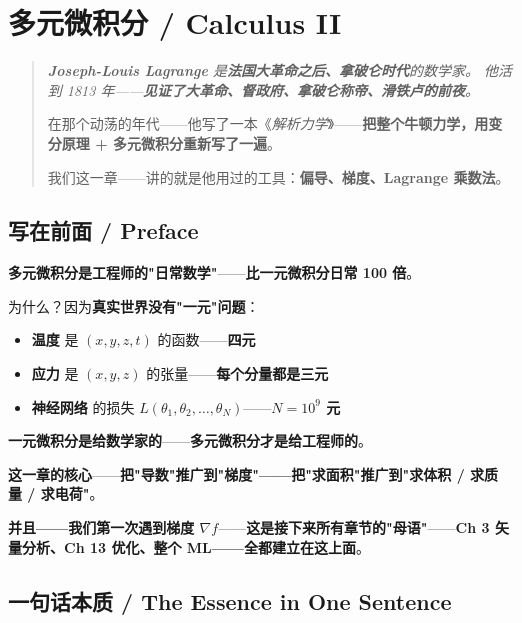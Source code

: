 
\chapter{多元微积分 / Calculus II}
\label{ch:calc2}

\begin{quote}\itshape
\textbf{Joseph-Louis Lagrange} 是\textbf{法国大革命之后、拿破仑时代}的数学家。
他活到 1813 年——\textbf{见证了大革命、督政府、拿破仑称帝、滑铁卢的前夜}。

在那个动荡的年代——他写了一本《\textit{解析力学}》——\textbf{把整个牛顿力学，用变分原理 + 多元微积分重新写了一遍}。

我们这一章——讲的就是他用过的工具：\textbf{偏导、梯度、Lagrange 乘数法}。
\end{quote}

\section{写在前面 / Preface}

\textbf{多元微积分是工程师的"日常数学"}——\textbf{比一元微积分日常 100 倍}。

为什么？因为\textbf{真实世界没有"一元"问题}：

\begin{itemize}
\item \textbf{温度} 是 $(x, y, z, t)$ 的函数——\textbf{四元}
\item \textbf{应力} 是 $(x, y, z)$ 的张量——\textbf{每个分量都是三元}
\item \textbf{神经网络} 的损失 $L(\theta_1, \theta_2, \ldots, \theta_N)$——\textbf{$N=10^9$ 元}
\end{itemize}

\textbf{一元微积分是给数学家的}——\textbf{多元微积分才是给工程师的}。

\textbf{这一章的核心}——\textbf{把"导数"推广到"梯度"——把"求面积"推广到"求体积 / 求质量 / 求电荷"}。

\textbf{并且——我们第一次遇到\textbf{梯度} $\nabla f$}——\textbf{这是接下来所有章节的"母语"}——\textbf{Ch 3 矢量分析、Ch 13 优化、整个 ML——全都建立在这上面}。

\section{一句话本质 / The Essence in One Sentence}

